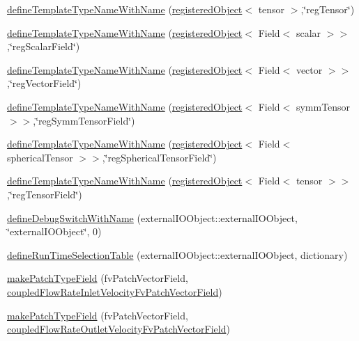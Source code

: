 \begin{DoxyCompactItemize}
\item 
\hyperlink{namespaceFoam_a0a66c7d2a1d438b5e1688a110f674aaa}{define\+Template\+Type\+Name\+With\+Name} (\hyperlink{classFoam_1_1registeredObject}{registered\+Object}$<$ tensor $>$,\char`\"{}reg\+Tensor\char`\"{})
\item 
\hyperlink{namespaceFoam_a7b6d39b089f807824b138214100530eb}{define\+Template\+Type\+Name\+With\+Name} (\hyperlink{classFoam_1_1registeredObject}{registered\+Object}$<$ Field$<$ scalar $>$$>$,\char`\"{}reg\+Scalar\+Field\char`\"{})
\item 
\hyperlink{namespaceFoam_a842e7850f6a014ed9c2edc14bbee76b2}{define\+Template\+Type\+Name\+With\+Name} (\hyperlink{classFoam_1_1registeredObject}{registered\+Object}$<$ Field$<$ vector $>$$>$,\char`\"{}reg\+Vector\+Field\char`\"{})
\item 
\hyperlink{namespaceFoam_a0c01340c2979b0b205956cad82214dfe}{define\+Template\+Type\+Name\+With\+Name} (\hyperlink{classFoam_1_1registeredObject}{registered\+Object}$<$ Field$<$ symm\+Tensor $>$$>$,\char`\"{}reg\+Symm\+Tensor\+Field\char`\"{})
\item 
\hyperlink{namespaceFoam_ae4b7757ec6f514f49f9ef46164301743}{define\+Template\+Type\+Name\+With\+Name} (\hyperlink{classFoam_1_1registeredObject}{registered\+Object}$<$ Field$<$ spherical\+Tensor $>$$>$,\char`\"{}reg\+Spherical\+Tensor\+Field\char`\"{})
\item 
\hyperlink{namespaceFoam_ade1772d0a4f79344abb501cfdd659cfa}{define\+Template\+Type\+Name\+With\+Name} (\hyperlink{classFoam_1_1registeredObject}{registered\+Object}$<$ Field$<$ tensor $>$$>$,\char`\"{}reg\+Tensor\+Field\char`\"{})
\item 
\hyperlink{namespaceFoam_afe0d23ba540a3bb37d950794c43e4070}{define\+Debug\+Switch\+With\+Name} (external\+I\+O\+Object\+::external\+I\+O\+Object, \char`\"{}external\+I\+O\+Object\char`\"{}, 0)
\item 
\hyperlink{namespaceFoam_ac8924145dbe200cbe5eb05d4fdfcbc01}{define\+Run\+Time\+Selection\+Table} (external\+I\+O\+Object\+::external\+I\+O\+Object, dictionary)
\item 
\hyperlink{namespaceFoam_aa5b92104162de53e4eb52b872cfc33c3}{make\+Patch\+Type\+Field} (fv\+Patch\+Vector\+Field, \hyperlink{classFoam_1_1coupledFlowRateInletVelocityFvPatchVectorField}{coupled\+Flow\+Rate\+Inlet\+Velocity\+Fv\+Patch\+Vector\+Field})
\item 
\hyperlink{namespaceFoam_aa3732345bfba2d6ccaee24f91a2a7fd3}{make\+Patch\+Type\+Field} (fv\+Patch\+Vector\+Field, \hyperlink{classFoam_1_1coupledFlowRateOutletVelocityFvPatchVectorField}{coupled\+Flow\+Rate\+Outlet\+Velocity\+Fv\+Patch\+Vector\+Field})
$$
\end{DoxyCompactItemize}

